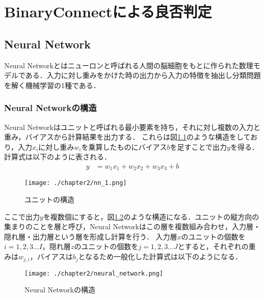 
\chapter{BinaryConnectによる良否判定}

\section{Neural Network}
Neural Networkとはニューロンと呼ばれる人間の脳細胞をもとに作られた数理モデルである．入力に対し重みをかけた時の出力から入力の特徴を抽出し分類問題を解く機械学習の1種である．


\subsection{Neural Networkの構造}
Neural Networkはユニットと呼ばれる最小要素を持ち，それに対し複数の入力と重み，バイアスから計算結果を出力する．
これらは図\ref{fig_NN1}のような構造をしており，入力$x_i$に対し重み$w_i$を乗算したものにバイアス$b$を足すことで出力$y$を得る．計算式は以下のように表される．
\begin{align}
y &= w_{1}x_{1} + w_{2}x_{2} + w_{3}x_{3} + b
\end{align}
\begin{figure}[htbp]
  \begin{center}
    \texttt{[image: ./chapter2/nn\_1.png]}
    \caption{ユニットの構造}
    \label{fig_NN1}
  \end{center}
\end{figure}

ここで出力$y$を複数個にすると，図\ref{fig_NN}のような構造になる．ユニットの縦方向の集まりのことを層と呼び，Neural Networkはこの層を複数組み合わせ，入力層・隠れ層・出力層という層を形成し計算を行う．
入力層$x$のユニットの個数を$i=1,2,3\ldots I$，隠れ層$z$のユニットの個数を$j=1,2,3\ldots J$とすると，それぞれの重みは$w_{j,i}$，バイアスは$b_j$となるため一般化した計算式は以下のようになる．
\begin{figure}[htbp]
  \begin{center}
    \texttt{[image: ./chapter2/neural\_network.png]}
    \caption{Neural Networkの構造}
    \label{fig_NN}
  \end{center}
\end{figure}

